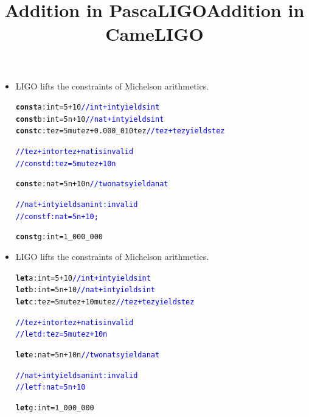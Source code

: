 \documentclass[wide]{slides}
\newcommand{\Kconst}[0]{\textbf{const}\xspace}
\newcommand{\Klet}[0]{\textbf{let}\xspace}
\newcommand{\com}[1]{\textcolor{blue}{{#1}}}
\begin{document}
\begin{slide}
  \title{Addition in PascaLIGO}

  \begin{itemize}

    \item LIGO lifts the constraints of Michelson arithmetics.

      \begin{alltt}
\Kconst a : int = 5 + 10                    \com{// int + int yields int}
\Kconst b : int = 5n + 10                   \com{// nat + int yields int}
\Kconst c : tez = 5mutez + 0.000\_010tez \com{// tez + tez yields tez}

\com{// tez + int or tez + nat is invalid}
\com{// const d : tez = 5mutez + 10n}

\Kconst e : nat = 5n + 10n \com{// two nats yield a nat}

\com{// nat + int yields an int: invalid}
\com{// const f : nat = 5n + 10;}

\Kconst g : int = 1_000_000
      \end{alltt}

  \end{itemize}

\end{slide}

\begin{slide}
  \title{Addition in CameLIGO}

  \begin{itemize}

    \item LIGO lifts the constraints of Michelson arithmetics.

      \begin{alltt}
\Klet a : int = 5 + 10             \com{// int + int yields int}
\Klet b : int = 5n + 10            \com{// nat + int yields int}
\Klet c : tez = 5mutez + 10mutez \com{// tez + tez yields tez}

\com{// tez + int or tez + nat is invalid}
\com{// let d : tez = 5mutez + 10n}

\Klet e : nat = 5n + 10n \com{// two nats yield a nat}

\com{// nat + int yields an int: invalid}
\com{// let f : nat = 5n + 10}

\Klet g : int = 1_000_000
      \end{alltt}

  \end{itemize}

\end{slide}
\end{document}
